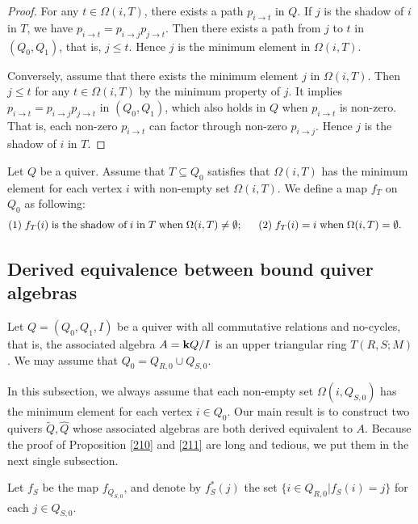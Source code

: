 \documentclass[a4paper, reqno]{amsart}
\theoremstyle{definition}
\theoremstyle{remark}
\numberwithin{equation}{section}
\begin{document}
\begin{proof}
For any $t\in\Omega(i,T)$, there exists a path $p_{i\to t}$ in $Q$. If $j$ is the shadow of $i$ in $T$, we have $p_{i\to t}=p_{i\to j}p_{j\to t}$. Then there exists a path from $j$ to $t$ in $(Q_0,Q_1)$, that is, $j\leq t$. Hence $j$ is the minimum element in $\Omega(i,T)$.

Conversely, assume that there exists the minimum element $j$ in $\Omega(i,T)$. Then $j\leq t$ for any $t\in\Omega(i,T)$ by the minimum property of $j$. It implies $p_{i\to t}=p_{i\to j}p_{j\to t}$ in $(Q_0,Q_1)$, which also holds in $Q$ when $p_{i\to t}$ is non-zero. That is, each non-zero $p_{i\to t}$ can factor through non-zero $p_{i\to j}$. Hence $j$ is the shadow of $i$ in $T$.
\end{proof}

Let $Q$ be a quiver. Assume that $T\subseteq Q_0$ satisfies that $\Omega(i,T)$ has the minimum element for each vertex $i$ with non-empty set $\Omega(i,T)$. We define a map $f_T$ on $Q_0$ as following:
\begin{align*}
(1)\;f_T(i)\;\textup{is the shadow of}\;i\;\textup{in}\;T\;\textup{when}\;\Omega(i,T)\neq\emptyset;\;\;\;\;\;\;&(2)\;f_T(i)=i\;\textup{when}\;\Omega(i,T)=\emptyset.
\end{align*}

\subsection{Derived equivalence between bound quiver algebras}
Let $Q=(Q_0,Q_1,I)$ be a quiver with all commutative relations and no-cycles, that is, the associated algebra $A={\bf k}Q/I$ is an upper triangular ring $T(R,S;M)$. We may assume that $Q_0=Q_{R,0}\cup Q_{S,0}$.

In this subsection, we always assume that each non-empty set $\Omega(i,Q_{S,0})$ has the minimum element for each vertex $i\in Q_0$. Our main result is to construct two quivers $\tilde{Q},\widehat{Q}$ whose associated algebras are both derived equivalent to $A$. Because the proof of Proposition \ref{210} and \ref{211} are long and tedious, we put them in the next single subsection.

Let $f_S$ be the map $f_{Q_{S,0}}$, and denote by $f_S^{*}(j)$ the set $\{i\in Q_{R,0}|f_S(i)=j\}$ for each $j\in Q_{S,0}$.
\end{document}

